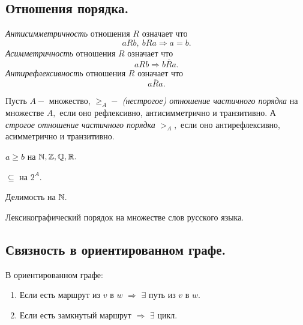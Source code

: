 \subsection{Отношения порядка.}

\begin{definition}
    \textit{Антисимметричность} отношения $R$ означает что
    $$aRb, \ bRa \Longrightarrow a = b.$$
    \textit{Асимметричность} отношения $R$ означает что
    $$aRb \Longrightarrow \overline{bRa}.$$
    \textit{Антирефлексивность} отношения $R$ означает что
    $$\overline{aRa}.$$
\end{definition}

\begin{definition}
    Пусть $A-$ множество, $\geq_{A} -$ \textit{(нестрогое) отношение частичного порядка} на множестве $A,$ если оно рефлексивно, антисимметрично и транзитивно. А \textit{строгое отношение частичного порядка} $>_{A},$ если оно антирефлексивно, асимметрично и транзитивно. 
\end{definition}

\begin{example}
    $a \geq b$ на $\mathbb{N}, \mathbb{Z}, \mathbb{Q}, \mathbb{R}.$
\end{example}

\begin{example}
    $\subseteq$ на $2^{A}.$
\end{example}

\begin{example}
     Делимость на $\mathbb{N}.$
\end{example}

\begin{example}
    Лексикографический порядок на множестве слов русского языка.
\end{example}

\subsection{Связность в ориентированном графе.}

\begin{proposition}
    В ориентированном графе:
    \begin{enumerate}
        \item Если есть маршрут из $v$ в $w$ $\Longrightarrow$ $\exists$ путь из $v$ в $w.$
        \item Если есть замкнутый маршрут $\Longrightarrow$ $\exists$ цикл.
    \end{enumerate}
\end{proposition}

